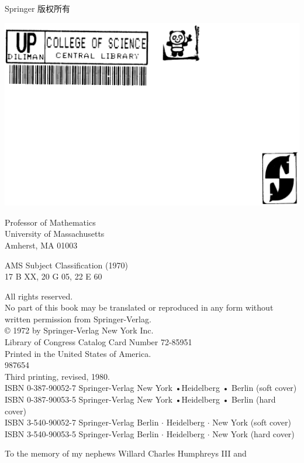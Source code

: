 \documentclass[10pt]{article}
\begin{document}
Springer 版权所有

\begin{center}
\includegraphics[max width=\textwidth]{2025_06_06_fac2836a92464059da43g-002}
\end{center}

Professor of Mathematics\\
University of Massachusetts\\
Amherst, MA 01003

AMS Subject Classification (1970)\\
17 B XX, 20 G 05, 22 E 60

All rights reserved.\\
No part of this book may be translated or reproduced in any form without written permission from Springer-Verlag.\\
© 1972 by Springer-Verlag New York Inc.\\
Library of Congress Catalog Card Number 72-85951\\
Printed in the United States of America.\\
987654\\
Third printing, revised, 1980.\\
ISBN 0-387-90052-7 Springer-Verlag New York •Heidelberg • Berlin (soft cover)\\
ISBN 0-387-90053-5 Springer-Verlag New York •Heidelberg • Berlin (hard cover)\\
ISBN 3-540-90052-7 Springer-Verlag Berlin $\cdot$ Heidelberg $\cdot$ New York (soft cover)\\
ISBN 3-540-90053-5 Springer-Verlag Berlin $\cdot$ Heidelberg $\cdot$ New York (hard cover)

To the memory of my nephews Willard Charles Humphreys III and
\end{document}
